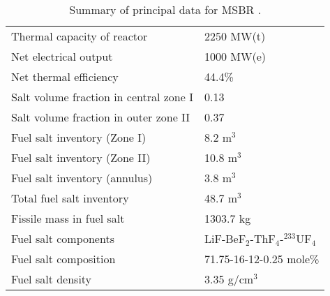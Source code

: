 \begin{table}[h!]
        \caption{Summary of principal data for MSBR 
\cite{robertson_conceptual_1971}.}
        \begin{tabularx}{\textwidth}{ s  s}
        \hline
                Thermal capacity of reactor           		& 2250 MW(t)
                \\ 
                Net electrical output                 		& 1000 MW(e) 
                \\  
                Net thermal efficiency        				& 44.4\%
                \\  
                Salt volume fraction in central zone I		& 0.13
                \\ 
                Salt volume fraction in outer zone II       & 0.37
                \\ 
                Fuel salt inventory (Zone I)                & 8.2 m$^3$	
                \\ 
                Fuel salt inventory (Zone II)               & 10.8 m$^3$	
                \\ 
                Fuel salt inventory (annulus)               & 3.8 m$^3$	
                \\  
                Total fuel salt inventory                   & 48.7 m$^3$	
                \\ 
                Fissile mass in fuel salt                   & 1303.7 kg	
                \\ 
                Fuel salt components                  & 
                LiF-BeF$_2$-ThF$_4$-$^{233}$UF$_4$	
                \\  
                Fuel salt composition                 & 
                71.75-16-12-0.25 mole\%
                \\
                Fuel salt density                    & 
                3.35 g/cm$^3$
                \\ \hline
        \end{tabularx}
        \label{tab:msbr_tab}
\end{table}

